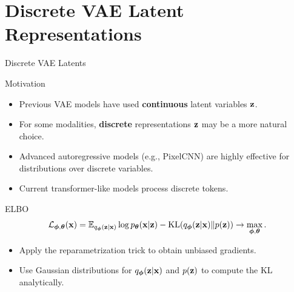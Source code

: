 \documentclass{beamer}
\renewcommand{\eqpause}{}
\begin{document}
\section{Discrete VAE Latent Representations}
\begin{frame}{Discrete VAE Latents}
	\begin{block}{Motivation}
		\begin{itemize}
			\item Previous VAE models have used \textbf{continuous} latent variables $\mathbf{z}$.
			\item For some modalities, \textbf{discrete} representations $\mathbf{z}$ may be a more natural choice.
			\item Advanced autoregressive models (e.g., PixelCNN) are highly effective for distributions over discrete variables.
			\item Current transformer-like models process discrete tokens.
		\end{itemize}
	\end{block}
	\eqpause
	\begin{block}{ELBO}
		\vspace{-0.3cm}
		\[
			\mathcal{L}_{\boldsymbol{\phi}, \boldsymbol{\theta}}(\mathbf{x})  = \mathbb{E}_{q_{\boldsymbol{\phi}}(\mathbf{z}| \mathbf{x})} \log p_{\boldsymbol{\theta}}(\mathbf{x}| \mathbf{z}) - \mathrm{KL}(q_{\boldsymbol{\phi}}(\mathbf{z}| \mathbf{x}) \| p(\mathbf{z})) \rightarrow \max_{\boldsymbol{\phi}, \boldsymbol{\theta}}.
		\]
		\vspace{-0.5cm}
	\end{block}
	\eqpause
	\begin{itemize}
		\item Apply the reparametrization trick to obtain unbiased gradients.
		\item Use Gaussian distributions for $q_{\boldsymbol{\phi}}(\mathbf{z}| \mathbf{x})$ and $p(\mathbf{z})$ to compute the KL analytically.
	\end{itemize}
\end{frame}
\end{document}
